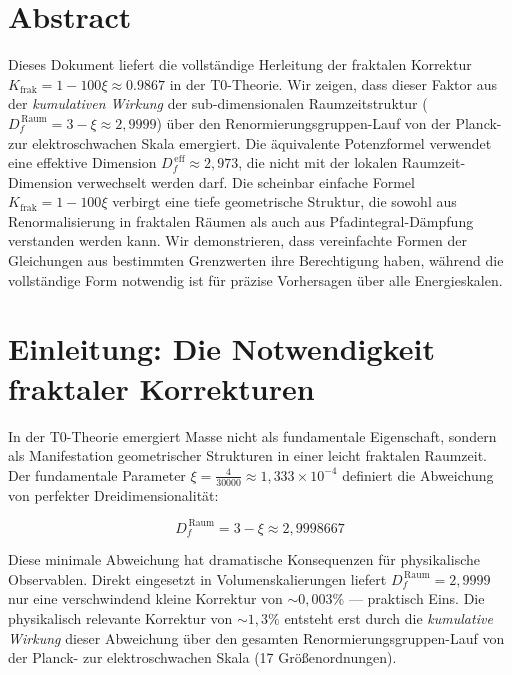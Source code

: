 \section*{Abstract}
		Dieses Dokument liefert die vollständige Herleitung der fraktalen Korrektur $K_{\text{frak}} = 1 - 100\xi \approx 0.9867$ in der T0-Theorie. Wir zeigen, dass dieser Faktor aus der \emph{kumulativen Wirkung} der sub-dimensionalen Raumzeitstruktur ($D_f^{\,\text{Raum}} = 3 - \xi \approx 2{,}9999$) über den Renormierungsgruppen-Lauf von der Planck- zur elektroschwachen Skala emergiert. Die äquivalente Potenzformel verwendet eine effektive Dimension $D_f^{\,\text{eff}} \approx 2{,}973$, die nicht mit der lokalen Raumzeit-Dimension verwechselt werden darf. Die scheinbar einfache Formel $K_{\text{frak}} = 1 - 100\xi$ verbirgt eine tiefe geometrische Struktur, die sowohl aus Renormalisierung in fraktalen Räumen als auch aus Pfadintegral-Dämpfung verstanden werden kann. Wir demonstrieren, dass vereinfachte Formen der Gleichungen aus bestimmten Grenzwerten ihre Berechtigung haben, während die vollständige Form notwendig ist für präzise Vorhersagen über alle Energieskalen.

	
	\setcounter{tocdepth}{3}  %
	
	\section{Einleitung: Die Notwendigkeit fraktaler Korrekturen}
	
	In der T0-Theorie emergiert Masse nicht als fundamentale Eigenschaft, sondern als Manifestation geometrischer Strukturen in einer leicht fraktalen Raumzeit. Der fundamentale Parameter $\xi = \frac{4}{30000} \approx 1{,}333 \times 10^{-4}$ definiert die Abweichung von perfekter Dreidimensionalität:
	
	\begin{equation}
		D_f^{\,\text{Raum}} = 3 - \xi \approx 2{,}9998667
		\label{eq:Df_def}
	\end{equation}
	
	Diese minimale Abweichung hat dramatische Konsequenzen für physikalische Observablen. Direkt eingesetzt in Volumenskalierungen liefert $D_f^{\,\text{Raum}} = 2{,}9999$ nur eine verschwindend kleine Korrektur von $\sim 0{,}003\%$ --- praktisch Eins. Die physikalisch relevante Korrektur von $\sim 1{,}3\%$ entsteht erst durch die \emph{kumulative Wirkung} dieser Abweichung über den gesamten Renormierungsgruppen-Lauf von der Planck- zur elektroschwachen Skala (17 Größenordnungen).
	
